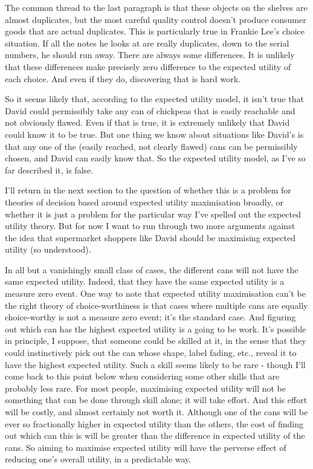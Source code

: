 \documentclass[
  11pt,
]{book}
\begin{document}
The common thread to the last paragraph is that these objects on the shelves are almost duplicates, but the most careful quality control doesn't produce consumer goods that are actual duplicates. This is particularly true in Frankie Lee's choice situation. If all the notes he looks at are really duplicates, down to the serial numbers, he should run away. There are always some differences. It is unlikely that these differences make precisely zero difference to the expected utility of each choice. And even if they do, discovering that is hard work.

So it seems likely that, according to the expected utility model, it isn't true that David could permissibly take any can of chickpeas that is easily reachable and not obviously flawed. Even if that is true, it is extremely unlikely that David could know it to be true. But one thing we know about situations like David's is that any one of the (easily reached, not clearly flawed) cans can be permissibly chosen, and David can easily know that. So the expected utility model, as I've so far described it, is false.

I'll return in the next section to the question of whether this is a problem for theories of decision based around expected utility maximisation broadly, or whether it is just a problem for the particular way I've spelled out the expected utility theory. But for now I want to run through two more arguments against the idea that supermarket shoppers like David should be maximising expected utility (so understood).

In all but a vanishingly small class of cases, the different cans will not have the same expected utility. Indeed, that they have the same expected utility is a measure zero event. One way to note that expected utility maximisation can't be the right theory of choice-worthiness is that cases where multiple cans are equally choice-worthy is not a measure zero event; it's the standard case. And figuring out which can has the highest expected utility is a going to be work. It's possible in principle, I suppose, that someone could be skilled at it, in the sense that they could instinctively pick out the can whose shape, label fading, etc., reveal it to have the highest expected utility. Such a skill seems likely to be rare - though I'll come back to this point below when considering some other skills that are probably less rare. For most people, maximising expected utility will not be something that can be done through skill alone; it will take effort. And this effort will be costly, and almost certainly not worth it. Although one of the cans will be ever so fractionally higher in expected utility than the others, the cost of finding out which can this is will be greater than the difference in expected utility of the cans. So aiming to maximise expected utility will have the perverse effect of reducing one's overall utility, in a predictable way.
\end{document}
